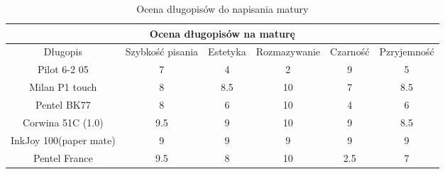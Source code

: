 \begin{table}[htbp]
\centering

    \begin{tabular}{|c|c|c|c|c|c|}\hline
         \multicolumn{6}{|c|}{Ocena długopisów na maturę}\\\hline \hline 
                 Długopis&  Szybkość pisania&  Estetyka&  Rozmazywanie&  Czarność&  Pzryjemność\\ \hline 
                 Pilot 6-2 05&  7&  4&  2&  9&  5\\ \hline 
                 Milan P1 touch&  8&  8.5&  10&  7&  8.5\\ \hline
                 Pentel BK77& 8& 6& 10& 4&6\\\hline
                 Corwina 51C (1.0)& 9.5& 9& 10& 9&8.5\\\hline
                 InkJoy 100(paper mate)& 9& 9& 9& 9&9\\\hline
                 Pentel France& 9.5& 8& 10& 2.5&7\\\hline
    \end{tabular}
    \label{tab:dlugopisy}
    \caption{Ocena długopisów do napisania matury} 
\end{table}
